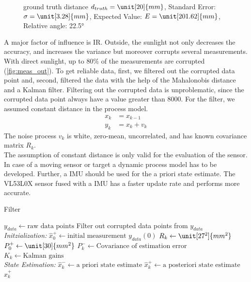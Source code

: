 \begin{figure}
\begin{minipage}{0.3\textwidth}
		\caption{ground truth distance $d_{truth}= \unit[20]{mm}$, Standard Error: $\sigma=\unit[3.28]{mm}$, Expected Value: $E=\unit[201.62]{mm}$, Relative angle: 22.5°}
		\label{fig:angl22.51}
	\end{minipage}
\end{figure}

A major factor of influence is IR. Outside, the sunlight not only decreases the accuracy, and increases the variance but moreover corrupts several measurements. With direct sunlight, up to 80\% of the measurements are corrupted (\cref{fig:meas_out}). To get reliable data, first, we filtered out the corrupted data point and, second, filtered the data with the help of the Mahalonobis distance and a Kalman filter. Filtering out the corrupted data is unproblematic, since the corrupted data point always have a value greater than 8000. For the filter, we assumed constant distance in the process model. 
\begin{equation}
	\label{eq:filter2}
	\begin{split} 
	x_k & = x_{k-1} \\
	y_k & = x_k + v_k
	\end{split}
\end{equation}
The noise process $v_k$ is white, zero-mean, uncorrelated, and has known covariance matrix  $R_k$.\\
The assumption of constant distance is only valid for the evaluation of the sensor. In case of a moving sensor or target a dynamic process model has to be developed. Further, a IMU should be used for the a priori state estimate. The VL53L0X sensor fused with a IMU has a faster update rate and performs more accurate. \\

\begin{algorithm}
	\caption{Filter}\label{alg:filter2}
	\begin{algorithmic}[1]
		\State $y_{data}\gets \text{raw data points}$ 
		\State Filter out corrupted data points from $y_{data}$ \\
		\textit{Initzialization:}
		\State $\hat{x}^+_0\gets\text{initial measurement }y_{data}(0)$
		\State $R_k\gets\unit[27^2]{mm^2}$ 
		\State $P^+_0\gets \unit[30]{mm^2}$ 
		\For{ each $k = (0, \text{ number of data point]}$}	
			\State  $P^-_k \gets \text{Covariance of estimation error}$
			\State	$K_k \gets \text{Kalman gains}$
		\EndFor \\
		\textit{State Estimation:}	 
		\For{ each $k = (0, \text{ number of data point]}$}
			\State {} 
			\State $\hat{x}^-_k \gets \text{a priori state estimate}$
			\State $\hat{x}^+_k \gets \text{a posteriori state estimate}$
		\EndFor
		\State \Return $\hat{x}^+_k$
		\EndProcedure

	\end{algorithmic}
\end{algorithm}


